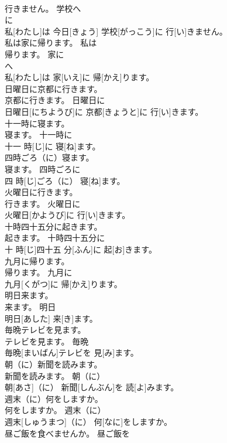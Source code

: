 \documentclass[8pt]{extreport}
\begin{document}
\begin{CJK}{UTF8}{min}
\\	行きません。	学校へ	
\\	に 
\\	私[わたし]は 今日[きょう] 学校[がっこう]に 行[い]きません。	
\\	私は家に帰ります。	私は
\\	帰ります。	家に	
\\	へ 
\\	私[わたし]は 家[いえ]に 帰[かえ]ります。	
\\	日曜日に京都に行きます。	
\\	京都に行きます。	日曜日に	
\\	日曜日[にちようび]に 京都[きょうと]に 行[い]きます。	
\\	十一時に寝ます。	
\\	寝ます。	十一時に	
\\	十一 時[じ]に 寝[ね]ます。	
\\	四時ごろ（に）寝ます。	
\\	寝ます。	四時ごろに	
\\	四 時[じ]ごろ（に） 寝[ね]ます。	
\\	火曜日に行きます。	
\\	行きます。	火曜日に	
\\	火曜日[かようび]に 行[い]きます。	
\\	十時四十五分に起きます。	
\\	起きます。	十時四十五分に	
\\	十 時[じ]四十五 分[ふん]に 起[お]きます。	
\\	九月に帰ります。	
\\	帰ります。	九月に	
\\	九月[くがつ]に 帰[かえ]ります。	
\\	明日来ます。	
\\	来ます。	明日	
\\	明日[あした] 来[き]ます。	
\\	毎晩テレビを見ます。	
\\	テレビを見ます。	毎晩	
\\	毎晩[まいばん]テレビを 見[み]ます。	
\\	朝（に）新聞を読みます。	
\\	新聞を読みます。	朝（に）	
\\	朝[あさ]（に） 新聞[しんぶん]を 読[よ]みます。	
\\	週末（に）何をしますか。	
\\	何をしますか。	週末（に）	
\\	週末[しゅうまつ]（に） 何[なに]をしますか。	
\\	昼ご飯を食べませんか。	昼ご飯を

\end{CJK}
\end{document}
